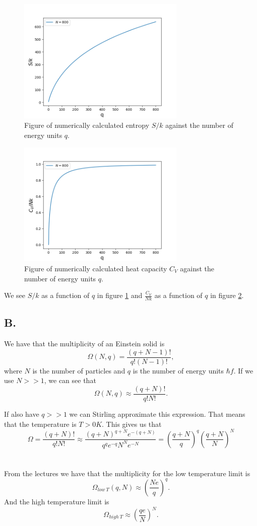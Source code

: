 \documentclass[reprint,english,notitlepage]{revtex4-1}  %
\begin{document}
\begin{figure}
\centering
\includegraphics[width=8cm]{../figures/S_mot_q.png}
\caption{Figure of numerically calculated entropy $S/k$ against the number of energy units $q$.}
\label{fig:S_mot_q}
\end{figure}
  
\begin{figure}
\centering
\includegraphics[width=8cm]{../figures/C_mot_q.png}
\caption{Figure of numerically calculated heat capacity $C_V$ against the number of energy units $q$.}
\label{fig:C_mot_q}
\end{figure}

We see $S/k$ as a function of $q$ in figure \ref{fig:S_mot_q} and $\frac{C_V}{Nk}$ as a function of $q$ in figure \ref{fig:C_mot_q}.

\subsection*{B.}

We have that the multiplicity of an Einstein solid is $$\Omega(N,q)=\frac{(q+N-1)!}{q!(N-1)!},$$
where $N$ is the number of particles and $q$ is the number of energy units $\hbar f$. If we use $N>>1$, we can see that $$ \Omega(N,q)\approx \frac{(q+N)!}{q!N!}.$$

If also have $q>>1$ we can Stirling approximate this expression. That means that the temperature is $T>0K$. This gives us that
$$ \Omega = \frac{(q+N)!}{q!N!}\approx\frac{(q+N)^{q+N} e^{-(q+N)}}{q^q e^{-q} N^N e^{-N}}=(\frac{q+N}{q})^q(\frac{q+N}{N})^N$$ 
\\~\\
From the lectures we have that the multiplicity for the low temperature limit is $$\Omega_{low\ T}(q,N)\approx (\frac{Ne}{q})^q.$$
And the high temperature limit is $$ \Omega_{high\ T}\approx (\frac{qe}{N})^N.$$
\end{document}
